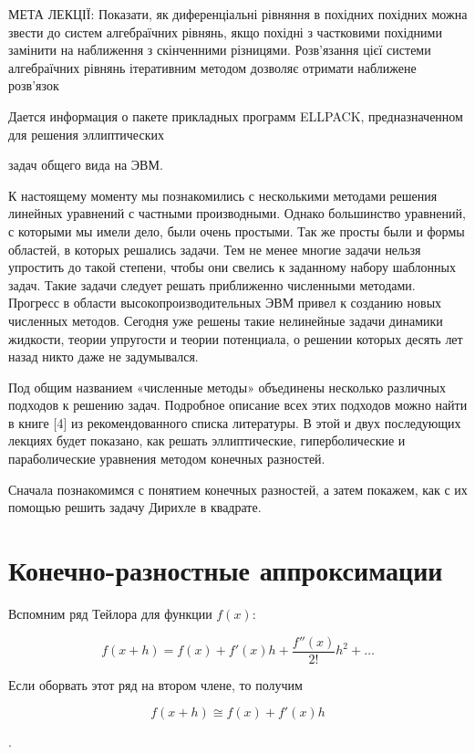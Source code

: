 \documentclass[
  ukrainian,
]{article}
\begin{document}
МЕТА ЛЕКЦІЇ: Показати, як диференціальні рівняння в похідних похідних
можна звести до систем алгебраїчних рівнянь, якщо похідні з частковими
похідними замінити на наближення з скінченними різницями. Розв'язання
цієї системи алгебраїчних рівнянь ітеративним методом дозволяє отримати
наближене розв'язок

Дается информация о пакете прикладных программ ELLPACK, предназначенном
для решения эллиптических

задач общего вида на ЭВМ.

К настоящему моменту мы познакомились с несколькими методами решения
линейных уравнений с частными производными. Однако большинство
уравнений, с которыми мы имели дело, были очень простыми. Так же просты
были и формы областей, в которых решались задачи. Тем не менее многие
задачи нельзя упростить до такой степени, чтобы они свелись к заданному
набору шаблонных задач. Такие задачи следует решать приближенно
численными методами. Прогресс в области высокопроизводительных ЭВМ
привел к созданию новых численных методов. Сегодня уже решены такие
нелинейные задачи динамики жидкости, теории упругости и теории
потенциала, о решении которых десять лет назад никто даже не
задумывался.

Под общим названием «численные методы» объединены несколько различных
подходов к решению задач. Подробное описание всех этих подходов можно
найти в книге {[}4{]} из рекомендованного списка литературы. В этой и
двух последующих лекциях будет показано, как решать эллиптические,
гиперболические и параболические уравнения методом конечных разностей.

Сначала познакомимся с понятием конечных разностей, а затем покажем, как
с их помощью решить задачу Дирихле в квадрате.

\section{Конечно-разностные
аппроксимации}\label{ux43aux43eux43dux435ux447ux43dux43e-ux440ux430ux437ux43dux43eux441ux442ux43dux44bux435-ux430ux43fux43fux440ux43eux43aux441ux438ux43cux430ux446ux438ux438}

Вспомним ряд Тейлора для функции \(f(x)\):

\[
f(x+h) = f(x) + f'(x)h + \frac{f''(x)}{2!}h^2 + \dots
\]

Если оборвать этот ряд на втором члене, то получим

\[
f(x+h) \cong f(x) + f'(x) h
\]

.
\end{document}
